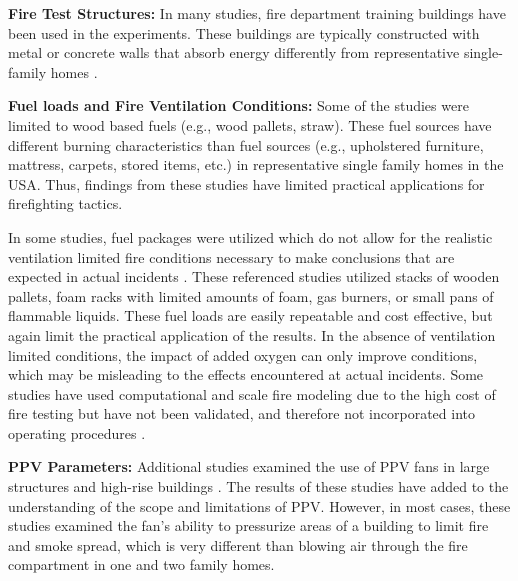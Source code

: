 \documentclass{article}
\begin{document}
\textbf{Fire Test Structures:} In many studies, fire department training buildings have been used in the experiments. These buildings are typically constructed with metal or concrete walls that absorb energy differently from representative single-family homes \cite{HughesPPVTesting} \cite{KerberPPVinTraining} \cite{SvennsonFireVentilationDuringOperatoins}. 

\textbf{Fuel loads and Fire Ventilation Conditions:} Some of the studies were limited to wood based fuels (e.g., wood pallets, straw). These fuel sources have different burning characteristics than fuel sources (e.g., upholstered furniture, mattress, carpets, stored items, etc.) in representative single family homes in the USA. Thus, findings from these studies \cite{HughesPPVTesting} \cite{KerberPPVinTraining} \cite{SvennsonFireVentilationDuringOperatoins} have limited practical applications for firefighting tactics. \par

In some studies, fuel packages were utilized which do not allow for the realistic ventilation limited fire conditions necessary to make conclusions that are expected in actual incidents \cite{ExekoyePPVHouseFires} \cite{SvenssonFireVentinLargeFireHall} \cite{BowserTacticalVent} \cite{EzekoyePPVStrucuresReport}. These referenced studies utilized stacks of wooden pallets, foam racks with limited amounts of foam, gas burners, or small pans of flammable liquids. These fuel loads are easily repeatable and cost effective, but again limit the practical application of the results. In the absence of ventilation limited conditions, the impact of added oxygen can only improve conditions, which may be misleading to the effects encountered at actual incidents. Some studies have used computational and scale fire modeling due to the high cost of fire testing but have not been validated, and therefore not incorporated into operating procedures \cite{Didona1993modeling} \cite{KerberPPVCFD} \cite{KerberPPVFDS} \cite{TuomisaariVentilationInFirefighting}. \par

\textbf{PPV Parameters:} \mbox{}Additional studies examined the use of PPV fans in large structures and high-rise buildings \cite{SymposiumHighRisePPV} \cite{KerberMadrzyPPVInLargeStructures} \cite{KerberMadrzyPPVInHighRise}. The results of these studies have added to the understanding of the scope and limitations of PPV. However, in most cases, these studies examined the fan’s ability to pressurize areas of a building to limit fire and smoke spread, which is very different than blowing air through the fire compartment in one and two family homes. 
\end{document}
